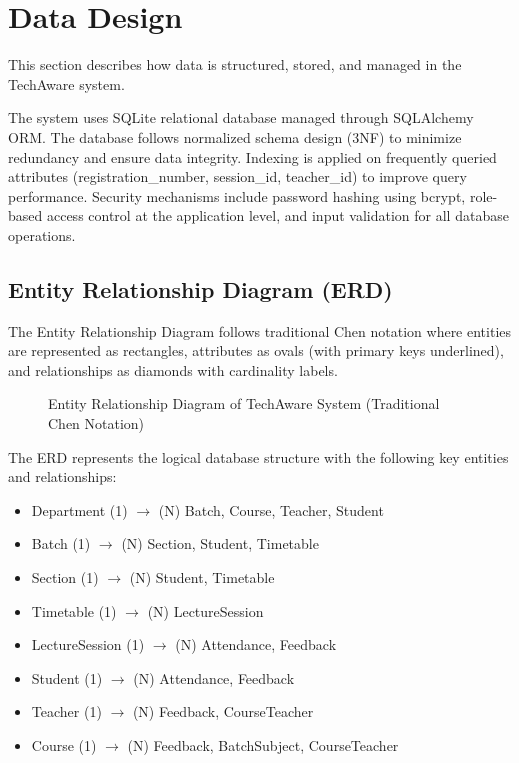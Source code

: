 \section{Data Design}

This section describes how data is structured, stored, and managed in the TechAware system.

The system uses SQLite relational database managed through SQLAlchemy ORM. The database follows normalized schema design (3NF) to minimize redundancy and ensure data integrity. Indexing is applied on frequently queried attributes (registration\_number, session\_id, teacher\_id) to improve query performance. Security mechanisms include password hashing using bcrypt, role-based access control at the application level, and input validation for all database operations.

\subsection{Entity Relationship Diagram (ERD)}

The Entity Relationship Diagram follows traditional Chen notation where entities are represented as rectangles, attributes as ovals (with primary keys underlined), and relationships as diamonds with cardinality labels.

\begin{figure}[H]
\centering
\resizebox{\textwidth}{!}{%

}
\caption{Entity Relationship Diagram of TechAware System (Traditional Chen Notation)}
\label{fig:erd}
\end{figure}

The ERD represents the logical database structure with the following key entities and relationships:

\begin{itemize}
    \item Department (1) $\rightarrow$ (N) Batch, Course, Teacher, Student
    \item Batch (1) $\rightarrow$ (N) Section, Student, Timetable
    \item Section (1) $\rightarrow$ (N) Student, Timetable
    \item Timetable (1) $\rightarrow$ (N) LectureSession
    \item LectureSession (1) $\rightarrow$ (N) Attendance, Feedback
    \item Student (1) $\rightarrow$ (N) Attendance, Feedback
    \item Teacher (1) $\rightarrow$ (N) Feedback, CourseTeacher
    \item Course (1) $\rightarrow$ (N) Feedback, BatchSubject, CourseTeacher
\end{itemize}




